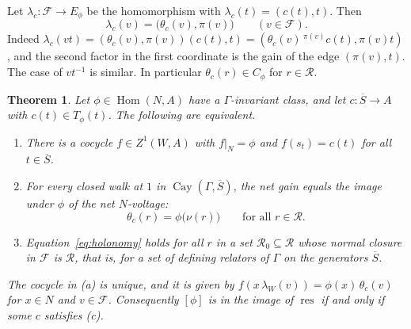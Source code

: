 \documentclass[12pt,letterpaper]{article}
\numberwithin{equation}{section}
\theoremstyle{plain}
\newtheorem{theorem}{Theorem}[section]
\theoremstyle{definition}
\newcommand{\act}[2]{{}^{#1}\!#2}          %
\newcommand{\fr}{\mathcal{F}}             %
\newcommand{\rel}{\mathcal{R}}            %
\DeclareMathOperator{\Hom}{Hom}
\DeclareMathOperator{\Cay}{Cay}
\DeclareMathOperator{\res}{res}
\begin{document}
Let $\lambda_c:\fr\to E_\phi$ be the homomorphism with
$\lambda_c(t)=(c(t),t)$. Then
\begin{equation}\label{eq:lambdac}
\lambda_c(v)=\bigl(\theta_c(v),\pi(v)\bigr)\qquad(v\in\fr).
\end{equation}
Indeed $\lambda_c(vt)=(\theta_c(v),\pi(v))(c(t),t)=(\theta_c(v)\,
\act{\pi(v)}{c(t)},\pi(v)t)$, and the second factor in the first
coordinate is the gain of the edge $(\pi(v),t)$. The case of $vt^{-1}$ is
similar. In particular $\theta_c(r)\in C_\phi$ for $r\in\rel$.

\begin{theorem}\label{thm:graph}
Let $\phi\in\Hom(N,A)$ have a $\Gamma$-invariant class, and let
$c:\overline{S}\to A$ with $c(t)\in T_\phi(t)$. The following are
equivalent.
\begin{enumerate}[label=\textup{(\alph*)},itemsep=1pt]
\item There is a cocycle $f\in Z^1(W,A)$ with $f|_N=\phi$ and
$f(s_t)=c(t)$ for all $t\in\overline{S}$.
\item For every closed walk at $1$ in $\Cay(\Gamma,\overline{S})$, the net
gain equals the image under $\phi$ of the net $N$-voltage:
\begin{equation}\label{eq:holonomy}
\theta_c(r)=\phi\bigl(\nu(r)\bigr)\qquad\text{for all } r\in\rel .
\end{equation}
\item Equation~\eqref{eq:holonomy} holds for all $r$ in a set
$\rel_0\subseteq\rel$ whose normal closure in $\fr$ is $\rel$, that is,
for a set of defining relators of $\Gamma$ on the generators
$\overline{S}$.
\end{enumerate}
The cocycle in \textup{(a)} is unique, and it is given by
$f(x\,\lambda_W(v))=\phi(x)\,\theta_c(v)$ for $x\in N$ and $v\in\fr$.
Consequently $[\phi]$ is in the image of $\res$ if and only if some $c$
satisfies \textup{(c)}.
\end{theorem}
\end{document}

